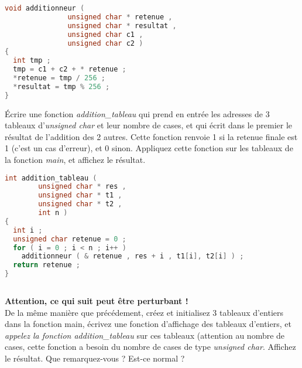 \begin{solutioncachee}
  \begin{lstlisting}[language=C]
void additionneur (
		       unsigned char * retenue ,
		       unsigned char * resultat ,
		       unsigned char c1 ,
		       unsigned char c2 )
{
  int tmp ;
  tmp = c1 + c2 + * retenue ;
  *retenue = tmp / 256 ;
  *resultat = tmp % 256 ;
}    
  \end{lstlisting}
\end{solutioncachee}

\question Écrire une fonction \emph{addition\_tableau} qui prend en
entrée les adresses de 3 tableaux d'\emph{unsigned char} et leur
nombre de cases, et qui écrit dans le premier le résultat de
l'addition des 2 autres. Cette fonction renvoie 1 si la retenue finale
est 1 (c'est un cas d'erreur), et 0 sinon. Appliquez cette fonction
sur les tableaux de la fonction \emph{main}, et affichez le résultat.

\begin{solutioncachee}
  \begin{lstlisting}[language=C]
int addition_tableau (
		unsigned char * res ,
		unsigned char * t1 ,
		unsigned char * t2 ,
		int n )
{
  int i ;
  unsigned char retenue = 0 ;
  for ( i = 0 ; i < n ; i++ )
    additionneur ( & retenue , res + i , t1[i], t2[i] ) ;
  return retenue ;
}
  
  \end{lstlisting}
\end{solutioncachee}


\question \textbf{Attention, ce qui suit peut être perturbant !}\\
De la même manière que précédement, créez et initialisez 3 tableaux
d'entiers dans la fonction main, écrivez une fonction d'affichage des
tableaux d'entiers, et \emph{appelez la fonction addition\_tableau}
sur ces tableaux (attention au nombre de cases, cette fonction a
besoin du nombre de cases de type \emph{unsigned char}. Affichez le
résultat. Que remarquez-vous ? Est-ce normal ?

